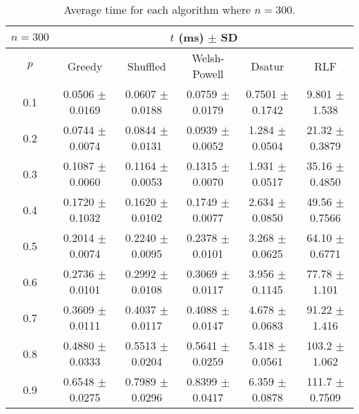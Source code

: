 \begin{table}[H]
    \centering
    \begin{tabular}{cccccc}
        
        $n = 300$& \multicolumn{5}{c}{$t$ (\unit{ms}) $\pm$ SD} \\
        \hline
        $p$ & Greedy & Shuffled & Welsh-Powell & Dsatur & RLF \\
        \hline
        0.1 & 0.0506 $\pm$ 0.0169 & 0.0607 $\pm$ 0.0188 & 0.0759 $\pm$ 0.0179 & 0.7501 $\pm$ 0.1742 & 9.801 $\pm$ 1.538 \\
        0.2 & 0.0744 $\pm$ 0.0074 & 0.0844 $\pm$ 0.0131 & 0.0939 $\pm$ 0.0052 & 1.284 $\pm$ 0.0504 & 21.32 $\pm$ 0.3879 \\
        0.3 & 0.1087 $\pm$ 0.0060 & 0.1164 $\pm$ 0.0053 & 0.1315 $\pm$ 0.0070 & 1.931 $\pm$ 0.0517 & 35.16 $\pm$ 0.4850 \\
        0.4 & 0.1720 $\pm$ 0.1032 & 0.1620 $\pm$ 0.0102 & 0.1749 $\pm$ 0.0077 & 2.634 $\pm$ 0.0850 & 49.56 $\pm$ 0.7566 \\
        0.5 & 0.2014 $\pm$ 0.0074 & 0.2240 $\pm$ 0.0095 & 0.2378 $\pm$ 0.0101 & 3.268 $\pm$ 0.0625 & 64.10 $\pm$ 0.6771 \\
        0.6 & 0.2736 $\pm$ 0.0101 & 0.2992 $\pm$ 0.0108 & 0.3069 $\pm$ 0.0117 & 3.956 $\pm$ 0.1145 & 77.78 $\pm$ 1.101 \\
        0.7 & 0.3609 $\pm$ 0.0111 & 0.4037 $\pm$ 0.0117 & 0.4088 $\pm$ 0.0147 & 4.678 $\pm$ 0.0683 & 91.22 $\pm$ 1.416 \\
        0.8 & 0.4880 $\pm$ 0.0333 & 0.5513 $\pm$ 0.0204 & 0.5641 $\pm$ 0.0259 & 5.418 $\pm$ 0.0561 & 103.2 $\pm$ 1.062 \\
        0.9 & 0.6548 $\pm$ 0.0275 & 0.7989 $\pm$ 0.0296 & 0.8399 $\pm$ 0.0417 & 6.359 $\pm$ 0.0878 & 111.7 $\pm$ 0.7509 \\
    
        \hline
    \end{tabular}
    \caption{Average time for each algorithm where $n = 300$.}
    \label{tab:avgTimeforV300}
\end{table}


